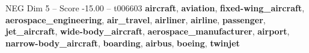 \begin{textsample}{NEG Dim 5 – Score -15.00 – t006603}  \label{ex:f5_neg_022}
\textbf{aircraft}, \textbf{aviation}, \textbf{fixed-wing\_aircraft}, \textbf{aerospace\_engineering}, \textbf{air\_travel}, \textbf{airliner}, \textbf{airline}, \textbf{passenger}, \textbf{jet\_aircraft}, \textbf{wide-body\_aircraft}, \textbf{aerospace\_manufacturer}, \textbf{airport}, \textbf{narrow-body\_aircraft}, \textbf{boarding}, \textbf{airbus}, \textbf{boeing}, \textbf{twinjet}

\end{textsample}
